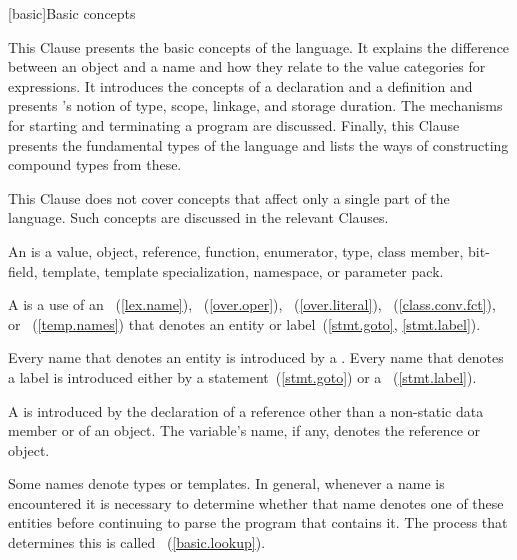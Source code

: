 [basic]{Basic concepts}


\pnum
\begin{note} This Clause presents the basic concepts of the \Cpp language.
It explains the difference between an object and a
name and how they relate to the value categories for expressions.
It introduces the concepts of a
declaration and a definition and presents \Cpp's
notion of type, scope, linkage, and
storage duration. The mechanisms for starting and
terminating a program are discussed. Finally, this Clause presents the
fundamental types of the language and lists the ways of constructing
compound types from these.\end{note}

\pnum
\begin{note} This Clause does not cover concepts that affect only a single
part of the language. Such concepts are discussed in the relevant
Clauses. \end{note}

\pnum
{}%
%
%
%
%
%
An  is a value, object, reference, function, enumerator, type,
class member, bit-field, template, template specialization, namespace, or
parameter pack.

\pnum
A  is a use of an ~(\ref{lex.name}),
~(\ref{over.oper}),
~(\ref{over.literal}),
~(\ref{class.conv.fct}), or
~(\ref{temp.names}) that denotes an entity or
label~(\ref{stmt.goto}, \ref{stmt.label}).

\pnum
Every name that denotes an entity is introduced by a
. Every name that denotes a label is introduced
either by a  statement~(\ref{stmt.goto}) or a
~(\ref{stmt.label}).

\pnum
A  is introduced by the
declaration of
a reference other than a non-static data member or of
an object. The variable's name, if any, denotes the reference or object.

\pnum
Some names denote types or templates. In general,
whenever a name is encountered it is necessary to determine whether that name denotes
one of these entities before continuing to parse the program that contains it. The
process that determines this is called
~(\ref{basic.lookup}).

